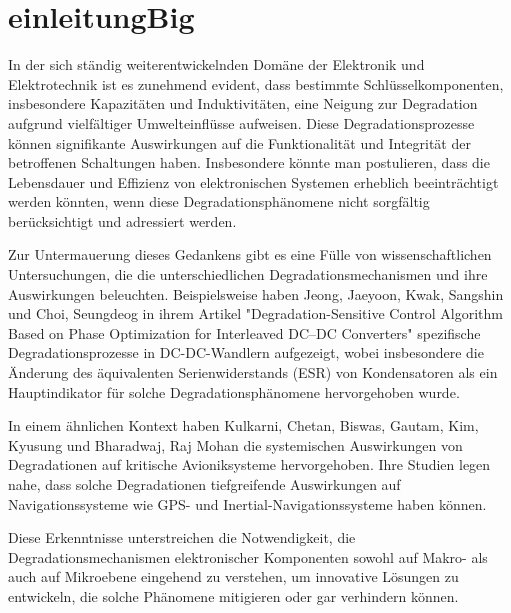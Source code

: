 \chapter{einleitungBig}
In der sich ständig weiterentwickelnden Domäne der Elektronik und Elektrotechnik ist es zunehmend evident, dass bestimmte Schlüsselkomponenten, insbesondere Kapazitäten und Induktivitäten, eine Neigung zur Degradation aufgrund vielfältiger Umwelteinflüsse aufweisen. Diese Degradationsprozesse können signifikante Auswirkungen auf die Funktionalität und Integrität der betroffenen Schaltungen haben. Insbesondere könnte man postulieren, dass die Lebensdauer und Effizienz von elektronischen Systemen erheblich beeinträchtigt werden könnten, wenn diese Degradationsphänomene nicht sorgfältig berücksichtigt und adressiert werden.

Zur Untermauerung dieses Gedankens gibt es eine Fülle von wissenschaftlichen Untersuchungen, die die unterschiedlichen Degradationsmechanismen und ihre Auswirkungen beleuchten. Beispielsweise haben Jeong, Jaeyoon, Kwak, Sangshin und Choi, Seungdeog in ihrem Artikel "Degradation-Sensitive Control Algorithm Based on Phase Optimization for Interleaved DC–DC Converters" spezifische Degradationsprozesse in DC-DC-Wandlern aufgezeigt, wobei insbesondere die Änderung des äquivalenten Serienwiderstands (ESR) von Kondensatoren als ein Hauptindikator für solche Degradationsphänomene hervorgehoben wurde\cite[p.~1]{jeong2023degradation}.

In einem ähnlichen Kontext haben Kulkarni, Chetan, Biswas, Gautam, Kim, Kyusung und Bharadwaj, Raj Mohan die systemischen Auswirkungen von Degradationen auf kritische Avioniksysteme hervorgehoben. Ihre Studien legen nahe, dass solche Degradationen tiefgreifende Auswirkungen auf Navigationssysteme wie GPS- und Inertial-Navigationssysteme haben können\cite[p.~3]{kulkarni_model-based_2023}.

Diese Erkenntnisse unterstreichen die Notwendigkeit, die Degradationsmechanismen elektronischer Komponenten sowohl auf Makro- als auch auf Mikroebene eingehend zu verstehen, um innovative Lösungen zu entwickeln, die solche Phänomene mitigieren oder gar verhindern können.
